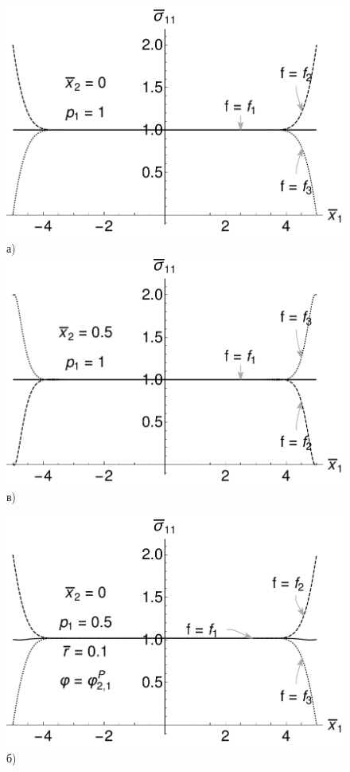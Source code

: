 \begin{figure}[ht]
    \begin{minipage}[b][][b]{0.49\linewidth}\centering
        \includegraphics[width=\linewidth]{pics/SaintVenantX0P1.pdf} \\ а)
        \includegraphics[width=\linewidth]{pics/SaintVenantX05P1.pdf} \\ в)
    \end{minipage}
    \hfill
    \begin{minipage}[b][][b]{0.49\linewidth}\centering
        \includegraphics[width=\linewidth]{pics/SaintVenantX0P05.pdf} \\ б)

\end{minipage}
\end{figure}
